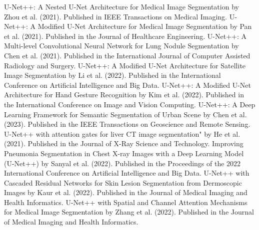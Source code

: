 \documentclass[conference]{IEEEtran}
\begin{document}
\begin{thebibliography}{00}
 U-Net++: A Nested U-Net Architecture for Medical Image Segmentation by Zhou et al. (2021). Published in IEEE Transactions on Medical Imaging.
 U-Net++: A Modified U-Net Architecture for Medical Image Segmentation by Pan et al. (2021). Published in the Journal of Healthcare Engineering.
 U-Net++: A Multi-level Convolutional Neural Network for Lung Nodule Segmentation by Chen et al. (2021). Published in the International Journal of Computer Assisted Radiology and Surgery.
 U-Net++: A Modified U-Net Architecture for Satellite Image Segmentation by Li et al. (2022). Published in the International Conference on Artificial Intelligence and Big Data.
 U-Net++: A Modified U-Net Architecture for Hand Gesture Recognition by Kim et al. (2022). Published in the International Conference on Image and Vision Computing.
 U-Net++: A Deep Learning Framework for Semantic Segmentation of Urban Scene by Chen et al. (2023). Published in the IEEE Transactions on Geoscience and Remote Sensing.
 U-Net++ with attention gates for liver CT image segmentation" by He et al. (2021). Published in the Journal of X-Ray Science and Technology.
 Improving Pneumonia Segmentation in Chest X-ray Images with a Deep Learning Model (U-Net++) by Sanyal et al. (2022). Published in the Proceedings of the 2022 International Conference on Artificial Intelligence and Big Data.
 U-Net++ with Cascaded Residual Networks for Skin Lesion Segmentation from Dermoscopic Images by Kaur et al. (2022). Published in the Journal of Medical Imaging and Health Informatics.
 U-Net++ with Spatial and Channel Attention Mechanisms for Medical Image Segmentation by Zhang et al. (2022). Published in the Journal of Medical Imaging and Health Informatics.

\end{thebibliography}
\end{document}
